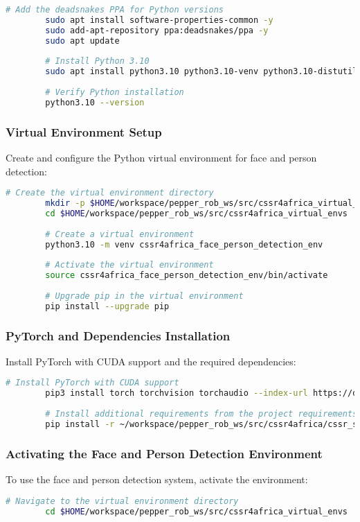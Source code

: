 \documentclass{CSSRforAfrica}
\begin{document}
{\begin{lstlisting}[style=withoutNumbering, language=bash]
		# Add the deadsnakes PPA for Python versions
		sudo apt install software-properties-common -y
		sudo add-apt-repository ppa:deadsnakes/ppa -y
		sudo apt update
		
		# Install Python 3.10
		sudo apt install python3.10 python3.10-venv python3.10-distutils -y
		
		# Verify Python installation
		python3.10 --version
		\end{lstlisting}
		
		\subsubsection*{Virtual Environment Setup}
		Create and configure the Python virtual environment for face and person detection:
		\begin{lstlisting}[style=withoutNumbering, language=bash]
		# Create the virtual environment directory
		mkdir -p $HOME/workspace/pepper_rob_ws/src/cssr4africa_virtual_envs
		cd $HOME/workspace/pepper_rob_ws/src/cssr4africa_virtual_envs
		
		# Create a virtual environment
		python3.10 -m venv cssr4africa_face_person_detection_env
		
		# Activate the virtual environment
		source cssr4africa_face_person_detection_env/bin/activate
		
		# Upgrade pip in the virtual environment
		pip install --upgrade pip
		\end{lstlisting}
		
		\subsubsection*{PyTorch and Dependencies Installation}
		Install PyTorch with CUDA support and the required dependencies:
		\begin{lstlisting}[style=withoutNumbering, language=bash]
		# Install PyTorch with CUDA support
		pip3 install torch torchvision torchaudio --index-url https://download.pytorch.org/whl/cu118
		
		# Install additional requirements from the project requirements file
		pip install -r ~/workspace/pepper_rob_ws/src/cssr4africa/cssr_system/face_detection/face_detection_requirements_x86.txt
		\end{lstlisting}
		
		\subsubsection*{Activating the Face and Person Detection Environment}
		To use the face and person detection system, activate the environment:
		\begin{lstlisting}[style=withoutNumbering, language=bash]
		# Navigate to the virtual environment directory
		cd $HOME/workspace/pepper_rob_ws/src/cssr4africa_virtual_envs
		

\end{lstlisting}}
\end{document}
